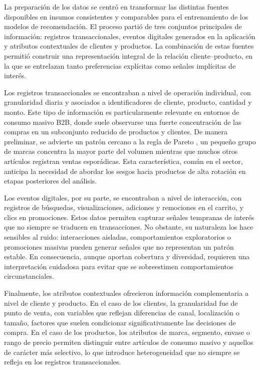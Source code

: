 La preparación de los datos se centró en transformar las distintas fuentes disponibles en insumos consistentes y comparables para el entrenamiento de los modelos de recomendación. El proceso partió de tres conjuntos principales de información: registros transaccionales, eventos digitales generados en la aplicación y atributos contextuales de clientes y productos. La combinación de estas fuentes permitió construir una representación integral de la relación cliente–producto, en la que se entrelazan tanto preferencias explícitas como señales implícitas de interés.

Los registros transaccionales se encontraban a nivel de operación individual, con granularidad diaria y asociados a identificadores de cliente, producto, cantidad y monto. Este tipo de información es particularmente relevante en entornos de consumo masivo B2B, donde suele observarse una fuerte concentración de las compras en un subconjunto reducido de productos y clientes. De manera preliminar, se advierte un patrón cercano a la regla de Pareto \cite{BOOK:Koch1998}, un pequeño grupo de marcas concentra la mayor parte del volumen mientras que muchos otros artículos registran ventas esporádicas. Esta característica, común en el sector, anticipa la necesidad de abordar los sesgos hacia productos de alta rotación en etapas posteriores del análisis.

Los eventos digitales, por su parte, se encontraban a nivel de interacción, con registros de búsquedas, visualizaciones, adiciones y remociones en el carrito, y clics en promociones. Estos datos permiten capturar señales tempranas de interés que no siempre se traducen en transacciones. No obstante, su naturaleza los hace sensibles al ruido: interacciones aisladas, comportamientos exploratorios o promociones masivas pueden generar señales que no representan un patrón estable. En consecuencia, aunque aportan cobertura y diversidad, requieren una interpretación cuidadosa para evitar que se sobreestimen comportamientos circunstanciales.

Finalmente, los atributos contextuales ofrecieron información complementaria a nivel de cliente y producto. En el caso de los clientes, la granularidad fue de punto de venta, con variables que reflejan diferencias de canal, localización o tamaño, factores que suelen condicionar significativamente las decisiones de compra. En el caso de los productos, los atributos de marca, segmento, envase o rango de precio permiten distinguir entre artículos de consumo masivo y aquellos de carácter más selectivo, lo que introduce heterogeneidad que no siempre se refleja en los registros transaccionales.

